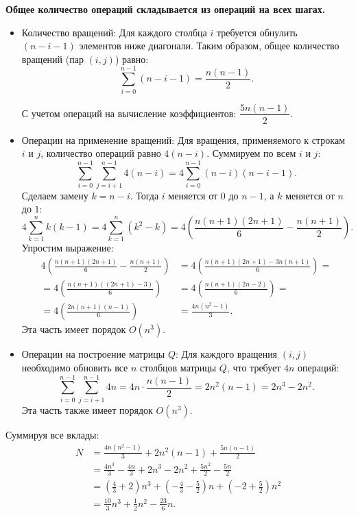\documentclass[12pt, a4paper]{article}
\begin{document}
\begin{enumerate}
		\textbf{Общее количество операций складывается из операций на всех шагах.}
		
		\begin{itemize}
			\item Количество вращений: Для каждого столбца $i$ требуется обнулить $(n - i - 1)$ элементов ниже диагонали. Таким образом, общее количество вращений (пар $(i, j)$) равно:
			\[
			\sum_{i=0}^{n-1} (n - i - 1) = \frac{n(n-1)}{2}.
			\]
			
			С учетом операций на вычисление коэффициентов:  $\dfrac{5n(n-1)}{2}.$
			
			\item Операции на применение вращений:
			Для вращения, применяемого к строкам $i$ и $j$, количество операций равно $4(n - i)$.
			Суммируем по всем $i$ и $j$:
			\[
			\sum_{i=0}^{n-1} \sum_{j=i+1}^{n-1} 4(n - i) = 4 \sum_{i=0}^{n-1} (n - i)(n - i - 1).
			\]
			Сделаем замену $k = n - i$. Тогда $i$ меняется от $0$ до $n-1$, а $k$ меняется от $n$ до $1$:
			\[
			4 \sum_{k=1}^{n} k(k - 1) = 4 \sum_{k=1}^{n} (k^2 - k) = 4 \left( \frac{n(n+1)(2n+1)}{6} - \frac{n(n+1)}{2} \right).
			\]
			Упростим выражение:
			\[
			\begin{aligned}
				4 \left( \frac{n(n+1)(2n+1)}{6} - \frac{n(n+1)}{2} \right) &= 4 \left( \frac{n(n+1)(2n+1) - 3n(n+1)}{6} \right) = \\
				= 4 \left( \frac{n(n+1)((2n+1) - 3)}{6} \right) &= 4 \left( \frac{n(n+1)(2n - 2)}{6} \right) = \\
				= 4 \left( \frac{2n(n+1)(n - 1)}{6} \right) & = \frac{4n(n^2 - 1)}{3}.
			\end{aligned}
			\]
			Эта часть имеет порядок $O(n^3)$.
			\item Операции на построение матрицы $Q$:
			Для каждого вращения $(i, j)$ необходимо обновить все $n$ столбцов матрицы $Q$, что требует $4n$ операций:
			\[
			\sum_{i=0}^{n-1} \sum_{j=i+1}^{n-1} 4n = 4n \cdot \frac{n(n-1)}{2} = 2n^2(n-1) = 2n^3 - 2n^2.
			\]
			Эта часть также имеет порядок $O(n^3)$.
		\end{itemize}
		
		Суммируя все вклады:
		\[
		\begin{aligned}
			N &= \frac{4n(n^2 - 1)}{3} + 2n^2(n-1) + \frac{5n(n-1)}{2} \\
			&= \frac{4n^3}{3} - \frac{4n}{3} + 2n^3 - 2n^2 + \frac{5n^2}{2} - \frac{5n}{2} \\
			&= \left(\frac{4}{3} + 2\right)n^3 + \left(-\frac{4}{3} - \frac{5}{2}\right)n + \left(-2 + \frac{5}{2}\right)n^2 \\
			&= \frac{10}{3}n^3 + \frac{1}{2}n^2 - \frac{23}{6}n.
		\end{aligned}
		\]
		

\end{enumerate}
\end{document}
